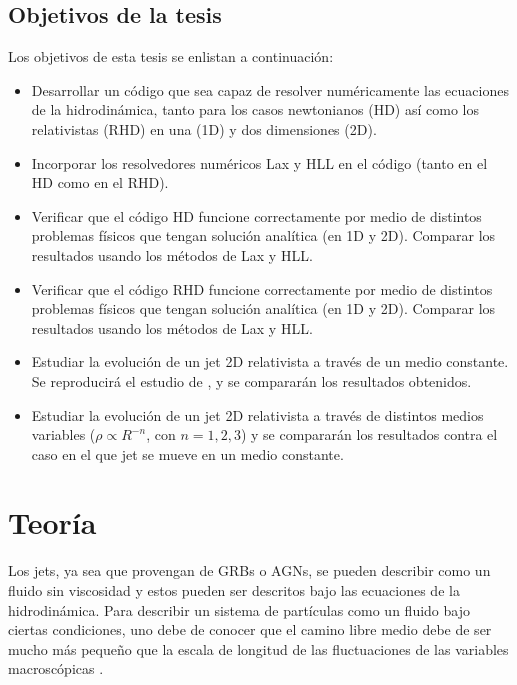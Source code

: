 \documentclass[12pt,a4paper]{book}
\begin{document}
\section{Objetivos de la tesis}
Los objetivos de esta tesis se enlistan a continuación:
\begin{itemize}
  \item Desarrollar un código que sea capaz de resolver numéricamente las ecuaciones de la hidrodinámica, tanto para los casos newtonianos (HD) así como los relativistas (RHD) en una (1D) y dos dimensiones (2D). 
  
  \item Incorporar los resolvedores numéricos Lax y HLL en el código (tanto en el HD como en el RHD).
  
  \item Verificar que el código HD funcione correctamente por medio de distintos problemas físicos que tengan solución analítica (en 1D y 2D). Comparar los resultados usando los métodos de Lax y HLL.

  \item Verificar que el código RHD funcione correctamente por medio de distintos problemas físicos que tengan solución analítica (en 1D y 2D). Comparar los resultados usando los métodos de Lax y HLL.
  
  \item Estudiar la evolución de un jet 2D relativista a través de un medio constante. Se reproducirá el estudio de \citet{MB-HLLC-I}, y se compararán los resultados obtenidos.

  \item Estudiar la evolución de un jet 2D relativista a través de distintos medios variables ($\rho \propto R^{-n}$, con $n=1, 2, 3$) y se compararán los resultados contra el caso en el que jet se mueve en un medio constante.

\end{itemize}





\chapter{Teoría}

Los jets, ya sea que provengan de GRBs o AGNs, se pueden describir como un fluido sin viscosidad %
y estos pueden ser descritos bajo las ecuaciones de la hidrodinámica.
Para describir un sistema de partículas como un fluido bajo ciertas condiciones, uno debe de conocer que el camino libre medio debe de ser mucho más pequeño que la escala de longitud de las 
fluctuaciones de las variables macroscópicas \citep{LeVeque1998}.
\end{document}
